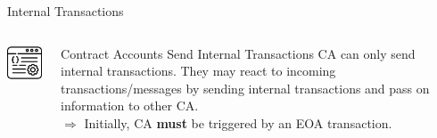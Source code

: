 \documentclass[handout]{beamer}
\begin{document}
\begin{frame}{Internal Transactions}

\begin{columns}[T]
	\begin{column}{0.25\textwidth}
		\includegraphics[width=3cm]{../assets/images/CA}
	\end{column} %
		
	\begin{column}{0.7\textwidth}
		\begin{keytakeaway}{Contract Accounts Send Internal Transactions}
			CA can only send internal transactions. They may react to incoming transactions/messages by sending internal transactions and pass on information to other CA.\\
			$\Rightarrow$ Initially, CA \textbf{must} be triggered by an EOA transaction.
		\end{keytakeaway}
	\end{column}
	
\end{columns}
\vspace{1em}



\end{frame}
\end{document}
